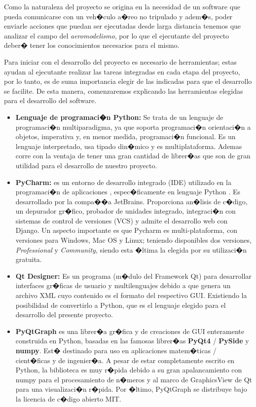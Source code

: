 	Como la naturaleza del proyecto se origina en la necesidad de un software que pueda comunicarse con un veh�culo a�reo no tripulado y adem�s, poder enviarle acciones que puedan ser ejecutadas desde larga distancia tenemos que analizar el campo del \textit{aeromodelismo}, por lo que el ejecutante del proyecto deber� tener los conocimientos necesarios para el mismo. 
	
	Para iniciar con el desarrollo del proyecto es necesario de herramientas; estas ayudan al ejecutante realizar las tareas integradas en cada etapa del proyecto, por lo tanto, es de suma importancia elegir de las indicadas para que el desarrollo se facilite. De esta manera, comenzaremos explicando las herramientas elegidas para el desarrollo del software. 


\begin{itemize}
	
	\item \textbf{Lenguaje de programaci�n Python: } Se trata de un lenguaje de programaci�n multiparadigma, ya que soporta programaci�n orientaci�n a objetos, imperativa y, en menor medida, programaci�n funcional. Es un lenguaje interpretado, usa tipado din�mico y es multiplataforma. Ademas corre con la ventaja de tener una gran cantidad de librer�as que son de gran utilidad para el desarrollo de nuestro proyecto.
	
	\item \textbf{PyCharm: } es un entorno de desarrollo integrado (IDE) utilizado en la programaci�n de aplicaciones , espec�ficamente en lenguaje Python . Es desarrollado por la compa��a JetBrains. Proporciona an�lisis de c�digo, un depurador gr�fico, probador de unidades integrado, integraci�n con sistemas de control de versiones (VCS) y admite el desarrollo web con Django. Un aspecto importante es que Pycharm es multi-plataforma, con versiones para Windows, Mac OS y Linux; teniendo  disponibles dos versiones, \textit{Professional} y \textit{Community}, siendo esta �ltima la elegida por su utilizaci�n gratuita. 
	
	\item \textbf{Qt Designer:} Es un programa (m�dulo del Framework Qt) para desarrollar interfaces gr�ficas de usuario y multilenguajes debido a que genera un archivo XML cuyo contenido es el formato del respectivo GUI. Existiendo la posibilidad de convertirlo a Python, que es el lenguaje elegido para el desarrollo del presente proyecto.
	
	
	\item \textbf{PyQtGraph} es una librer�a gr�fica y de creaciones de GUI enteramente construida en Python, basadas en las famosas librer�as \textbf{PyQt4} / \textbf{PySide} y \textbf{numpy}. Est� destinado para uso en aplicaciones matem�ticas / cient�ficas y de ingenier�a. A pesar de estar completamente escrito en Python, la biblioteca es muy r�pida debido a su gran apalancamiento con numpy para el procesamiento de n�meros y al marco de GraphicsView de Qt para una visualizaci�n r�pida. Por �ltimo, PyQtGraph se distribuye bajo la licencia de c�digo abierto MIT.
	

\end{itemize}
